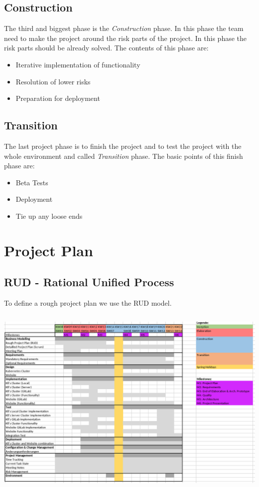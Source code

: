 \subsection{Construction}
The third and biggest phase is the \textit{Construction} phase. In this phase the team need to make the project around the risk parts of the project. In this phase the risk parts should be already solved.
The contents of this phase are:
\begin{itemize}
    \item Iterative implementation of functionality
    \item Resolution of lower risks
    \item Preparation for deployment
\end{itemize}

\subsection{Transition}
The last project phase is to finish the project and to test the project with the whole environment and called \textit{Transition} phase.
The basic points of this finish phase are:
\begin{itemize}
    \item Beta Tests
    \item Deployment
    \item Tie up any loose ends
\end{itemize}

\section{Project Plan}
\subsection{RUD - Rational Unified Process}
To define a rough project plan we use the RUD model. \newline
\includegraphics[height=10cm]{resources/project-plan-RUD.png}


